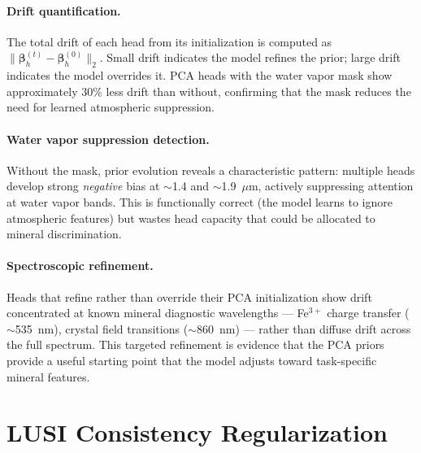 \documentclass[11pt]{report}
\begin{document}
\paragraph{Drift quantification.}
The total drift of each head from its initialization is computed as $\|\bm{\beta}_h^{(t)} - \bm{\beta}_h^{(0)}\|_2$. Small drift indicates the model refines the prior; large drift indicates the model overrides it. PCA heads with the water vapor mask show approximately 30\% less drift than without, confirming that the mask reduces the need for learned atmospheric suppression.

\paragraph{Water vapor suppression detection.}
Without the mask, prior evolution reveals a characteristic pattern: multiple heads develop strong \emph{negative} bias at $\sim$1.4 and $\sim$1.9~$\mu$m, actively suppressing attention at water vapor bands. This is functionally correct (the model learns to ignore atmospheric features) but wastes head capacity that could be allocated to mineral discrimination.

\paragraph{Spectroscopic refinement.}
Heads that refine rather than override their PCA initialization show drift concentrated at known mineral diagnostic wavelengths --- Fe$^{3+}$ charge transfer ($\sim$535~nm), crystal field transitions ($\sim$860~nm) --- rather than diffuse drift across the full spectrum. This targeted refinement is evidence that the PCA priors provide a useful starting point that the model adjusts toward task-specific mineral features.


\section{LUSI Consistency Regularization}
\label{chap:lusi}
\end{document}
